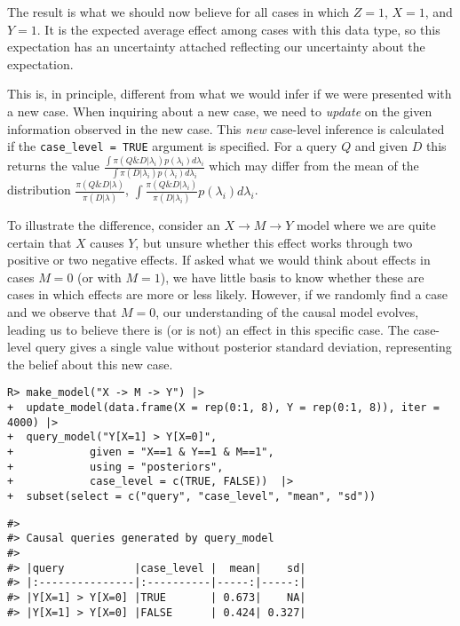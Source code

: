 \documentclass[
  11pt,
  article]{jss}
\begin{document}
The result is what we should now believe for all cases in which \(Z=1\),
\(X=1\), and \(Y=1\). It is the expected average effect among cases with
this data type, so this expectation has an uncertainty attached
reflecting our uncertainty about the expectation.

This is, in principle, different from what we would infer if we were
presented with a new case. When inquiring about a new case, we need to
\emph{update} on the given information observed in the new case. This
\emph{new} case-level inference is calculated if the
\texttt{case\_level\ =\ TRUE} argument is specified. For a query \(Q\)
and given \(D\) this returns the value
\(\frac{\int\pi(Q \& D | \lambda_i)p(\lambda_i)d\lambda_i}{\int\pi(D | \lambda_i)p(\lambda_i)d\lambda_i}\)
which may differ from the mean of the distribution
\(\frac{\pi(Q \& D | \lambda)}{\pi(D | \lambda)}\),
\(\int \frac{\pi(Q \& D | \lambda_i)}{\pi(D | \lambda_i)} p(\lambda_i)d\lambda_i\).

To illustrate the difference, consider an
\(X \rightarrow M \rightarrow Y\) model where we are quite certain that
\(X\) causes \(Y\), but unsure whether this effect works through two
positive or two negative effects. If asked what we would think about
effects in cases \(M=0\) (or with \(M=1\)), we have little basis to know
whether these are cases in which effects are more or less likely.
However, if we randomly find a case and we observe that \(M=0\), our
understanding of the causal model evolves, leading us to believe there
is (or is not) an effect in this specific case. The case-level query
gives a single value without posterior standard deviation, representing
the belief about this new case.

\begin{verbatim}
R> make_model("X -> M -> Y") |>
+  update_model(data.frame(X = rep(0:1, 8), Y = rep(0:1, 8)), iter = 4000) |>
+  query_model("Y[X=1] > Y[X=0]", 
+            given = "X==1 & Y==1 & M==1", 
+            using = "posteriors",
+            case_level = c(TRUE, FALSE))  |> 
+  subset(select = c("query", "case_level", "mean", "sd"))
\end{verbatim}

\begin{verbatim}
#> 
#> Causal queries generated by query_model
#> 
#> |query           |case_level |  mean|    sd|
#> |:---------------|:----------|-----:|-----:|
#> |Y[X=1] > Y[X=0] |TRUE       | 0.673|    NA|
#> |Y[X=1] > Y[X=0] |FALSE      | 0.424| 0.327|
\end{verbatim}
\end{document}
